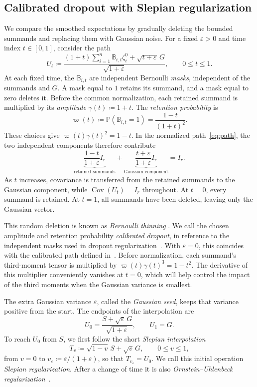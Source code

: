 \documentclass[11pt,letterpaper]{article}
\theoremstyle{remark}
\newcommand{\Pp}{\mathbb P}
\newcommand{\Cov}{\operatorname{Cov}}
\begin{document}
\subsection{Calibrated dropout with Slepian regularization}
\label{sec:outline-path}

We compare the smoothed expectations by gradually deleting the bounded
summands and replacing them with Gaussian noise. For a fixed
\(\varepsilon>0\) and time index \(t\in[0,1]\), consider the path
\begin{equation}
 U_t\coloneqq
 \frac{(1+t)\sum_{i=1}^n\mathbb B_{i,t}\zeta_i^0
             +\sqrt{t+\varepsilon}\,G}{\sqrt{1+\varepsilon}},
 \qquad 0\le t\le1.
 \label{eq:path}
\end{equation}
At each fixed time, the \(\mathbb B_{i,t}\) are independent Bernoulli
\emph{masks}, independent of the summands and \(G\). A mask equal to \(1\) retains
its summand, and a mask equal to zero deletes it. Before the common
normalization, each retained summand is multiplied by its \emph{amplitude}
\(\gamma(t)\coloneqq1+t\). The \emph{retention probability} is
\[
 \varpi(t)\coloneqq\Pp(\mathbb B_{i,t}=1)
             =\frac{1-t}{(1+t)^2}.
\]
These choices give \(\varpi(t)\gamma(t)^2=1-t\). In the normalized
path~\eqref{eq:path}, the two independent components therefore contribute
\[
 \underbrace{\frac{1-t}{1+\varepsilon}I_r}_{\text{retained summands}}
 +\underbrace{\frac{t+\varepsilon}{1+\varepsilon}I_r}_{\text{Gaussian component}}
 =I_r.
\]
As \(t\) increases, covariance is transferred from the retained summands
to the Gaussian component, while \(\Cov(U_t)=I_r\) throughout.
At \(t=0\), every summand is retained. At \(t=1\), all summands have
been deleted, leaving only the Gaussian vector.

This random deletion is known as \emph{Bernoulli thinning}
\cite{Renyi1956,SteutelHarn1979,LastPenrose2017}. We call the
chosen amplitude and retention probability \emph{calibrated dropout},
in reference to the independent masks used in dropout regularization~\cite{Dropout2014}.
With \(\varepsilon=0\), this coincides with the calibrated path
defined in~\cite[Section~4]{AL}. Before normalization, each summand's third-moment tensor is multiplied
by \(\varpi(t)\gamma(t)^3=1-t^2\). The derivative of this multiplier
conveniently vanishes at \(t=0\), which will help control the impact of
the third moments when the Gaussian variance is smallest.

The extra Gaussian variance \(\varepsilon\), called the
\emph{Gaussian seed}, keeps that variance positive from the start.
The endpoints of the interpolation are
\[
 U_0=\frac{S+\sqrt\varepsilon\,G}{\sqrt{1+\varepsilon}},
 \qquad U_1=G.
\]
To reach \(U_0\) from \(S\), we first follow the short
\emph{Slepian interpolation}
\[
 T_v\coloneqq\sqrt{1-v}\,S+\sqrt v\,G,\qquad 0\le v\le1,
\]
from \(v=0\) to \(v_\varepsilon\coloneqq
\varepsilon/(1+\varepsilon)\), so that \(T_{v_\varepsilon}=U_0\).
We call this initial operation \emph{Slepian regularization}.
After a change of time it is also
\emph{Ornstein--Uhlenbeck regularization}~\cite[Theorem~4.12]{Nourdin2012}.
\end{document}
